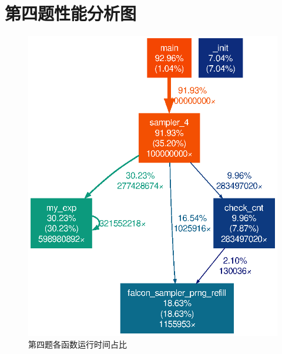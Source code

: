 \documentclass{article}
\begin{document}
    \section{第四题性能分析图}
    \begin{figure}[h!]
        \centering
        \includegraphics[width=.9\textwidth]{../gprof_figs/sampler_4.eps}
        \caption{第四题各函数运行时间占比}
    \end{figure}
\end{document}
